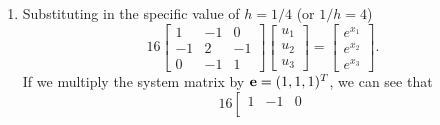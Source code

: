 {\begin{solution}
\begin{enumerate}
\begin{eqnarray*}
\frac{-u_{3} + 2u_2 - u_{1}}{h^2} =  f(x_2)\\
\frac{-u_{4} + 2u_3 - u_{2}}{h^2} =  f(x_3).
\end{eqnarray*}
This reduces to
\begin{eqnarray*}
\frac{-u_{2} + u_1 }{h^2} =  f(x_1)\\
\frac{-u_{3} + 2u_2 - u(x_{1})}{h^2} =  f(x_2)\\
\frac{u_3 - u_{2}}{h^2} =  f(x_3).
\end{eqnarray*}
The corresponding matrix system can be written
\[
\frac{1}{h^2}\left[\begin{array}{ccc}
              1 & -1&0 \\
               -1 & 2 &  -1  \\
                 0 &   -1  & 1 
               \end{array}\right]
               \left[\begin{array}{c}
               u_1\\u_2\\u_3
               \end{array}\right] = 
                              \left[\begin{array}{c}
               f(x_1)\\f(x_2)\\f(x_3) 
               \end{array}\right].
\]
\item Substituting in the specific value of $h = 1/4$ (or $1/h = 4$)
\[
16\left[\begin{array}{ccc}
              1 & -1&0 \\
               -1 & 2 &  -1  \\
                 0 &   -1  & 1 
               \end{array}\right]
               \left[\begin{array}{c}
               u_1\\u_2\\u_3
               \end{array}\right] = 
                              \left[\begin{array}{c}
               e^{x_1}\\e^{x_2}\\e^{x_3}
               \end{array}\right].
\]
If we multiply the system matrix by ${\bf e} = (1,1,1)^T$, we can see that 
\[
16\left[\begin{array}{ccc}
              1 & -1&0 \\

\end{array}\]
\end{enumerate}
\end{solution}}
